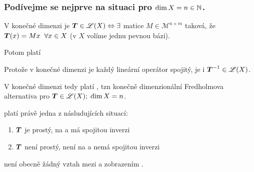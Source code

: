 \subsubsection{Podívejme se nejprve na situaci pro $\dim X=n\in \mathbb{N}$.}

V konečné dimenzi je $ \boldsymbol{T} \in \mathscr{L}(X)\Leftrightarrow \exists$ matice $M\in \mathcal{M}^{n\times m}$ taková, že $ \boldsymbol{T} (x)=Mx \;\;\forall x \in X$ (v $X$ volíme jednu pevnou bázi).

Potom platí 


Protože v konečné dimenzi je každý lineární operátor spojitý, je i $ \boldsymbol{T} ^{-1}\in\mathscr{L}(X)$.

V konečné dimenzi tedy platí , tzn konečně dimenzionální Fredholmova alternativa pro $ \boldsymbol{T} \in\mathscr{L}(X);\;\dim X=n$.

platí právě jedna z násludujících situací:
\begin{enumerate}
    \item $ \boldsymbol{T} $ je prostý, na a má spojitou inverzi
    \item $ \boldsymbol{T} $ není prostý, není na a nemá spojitou inverzi
\end{enumerate}
 není obecně žádný vztah mezi  a zobrazením .

